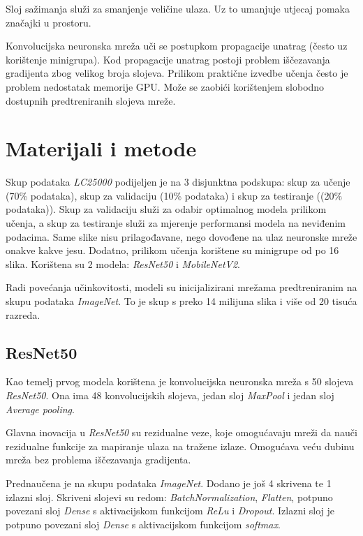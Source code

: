 \documentclass[conference, utf8]{IEEEtran}
\begin{document}
	Sloj sažimanja služi za smanjenje veličine ulaza. Uz to umanjuje utjecaj pomaka značajki u prostoru.
	
	Konvolucijska neuronska mreža uči se postupkom propagacije unatrag (često uz korištenje minigrupa). Kod propagacije unatrag postoji problem iščezavanja gradijenta zbog velikog broja slojeva. Prilikom praktične izvedbe učenja često je problem nedostatak memorije GPU. Može se zaobići korištenjem slobodno dostupnih predtreniranih slojeva mreže.
	
	\section{Materijali i metode}
	Skup podataka \textit{LC25000} podijeljen je na 3 disjunktna podskupa: skup za učenje (70\% podataka), skup za validaciju (10\% podataka) i skup za testiranje ((20\% podataka)). Skup za validaciju služi za odabir optimalnog modela prilikom učenja, a skup za testiranje služi za mjerenje performansi modela na neviđenim podacima. Same slike nisu prilagođavane, nego dovođene na ulaz neuronske mreže onakve kakve jesu. Dodatno, prilikom učenja korištene su minigrupe od po 16 slika. Korištena su 2 modela: \textit{ResNet50} i \textit{MobileNetV2}. 
	
	Radi povećanja učinkovitosti, modeli su inicijalizirani mrežama predtreniranim na skupu podataka \textit{ImageNet}. To je skup s preko 14 milijuna slika i više od 20 tisuća razreda. 
	
	\subsection{ResNet50}
	Kao temelj prvog modela korištena je konvolucijska neuronska mreža s 50 slojeva \textit{ResNet50}. Ona ima 48 konvolucijskih slojeva, jedan sloj \textit{MaxPool} i jedan sloj \textit{Average pooling}. 
	
	Glavna inovacija u \textit{ResNet50} su rezidualne veze, koje omogućavaju mreži da nauči rezidualne funkcije za mapiranje ulaza na tražene izlaze. Omogućava veću dubinu mreža bez problema iščezavanja gradijenta. 
	
	Prednaučena je na skupu podataka \textit{ImageNet}. Dodano je još 4 skrivena te 1 izlazni sloj. Skriveni slojevi su redom: \textit{BatchNormalization}, \textit{Flatten}, potpuno povezani sloj \textit{Dense} s aktivacijskom funkcijom \textit{ReLu} i \textit{Dropout}. Izlazni sloj je potpuno povezani sloj \textit{Dense} s aktivacijskom funkcijom \textit{softmax}.
	
\end{document}
